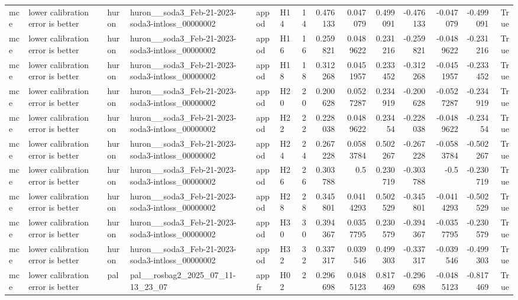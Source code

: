 \begin{longtable}{llllllrrrrrrrr}
mce & lower calibration error is better & huron & huron\_\_soda3\_Feb-21-2023-soda3-intloss\_00000002 & appod & H14 & 14 & 0.476133 & 0.047079 & 0.499091 & -0.476133 & -0.047079 & -0.499091 & True \\
mce & lower calibration error is better & huron & huron\_\_soda3\_Feb-21-2023-soda3-intloss\_00000002 & appod & H16 & 16 & 0.259821 & 0.0489622 & 0.231216 & -0.259821 & -0.0489622 & -0.231216 & True \\
mce & lower calibration error is better & huron & huron\_\_soda3\_Feb-21-2023-soda3-intloss\_00000002 & appod & H18 & 18 & 0.312268 & 0.0451957 & 0.233452 & -0.312268 & -0.0451957 & -0.233452 & True \\
mce & lower calibration error is better & huron & huron\_\_soda3\_Feb-21-2023-soda3-intloss\_00000002 & appod & H20 & 20 & 0.200628 & 0.0527287 & 0.234919 & -0.200628 & -0.0527287 & -0.234919 & True \\
mce & lower calibration error is better & huron & huron\_\_soda3\_Feb-21-2023-soda3-intloss\_00000002 & appod & H22 & 22 & 0.228038 & 0.0489622 & 0.23454 & -0.228038 & -0.0489622 & -0.23454 & True \\
mce & lower calibration error is better & huron & huron\_\_soda3\_Feb-21-2023-soda3-intloss\_00000002 & appod & H24 & 24 & 0.267228 & 0.0583784 & 0.502267 & -0.267228 & -0.0583784 & -0.502267 & True \\
mce & lower calibration error is better & huron & huron\_\_soda3\_Feb-21-2023-soda3-intloss\_00000002 & appod & H26 & 26 & 0.303788 & 0.5 & 0.230719 & -0.303788 & -0.5 & -0.230719 & True \\
mce & lower calibration error is better & huron & huron\_\_soda3\_Feb-21-2023-soda3-intloss\_00000002 & appod & H28 & 28 & 0.345801 & 0.0414293 & 0.502529 & -0.345801 & -0.0414293 & -0.502529 & True \\
mce & lower calibration error is better & huron & huron\_\_soda3\_Feb-21-2023-soda3-intloss\_00000002 & appod & H30 & 30 & 0.394367 & 0.0357795 & 0.230579 & -0.394367 & -0.0357795 & -0.230579 & True \\
mce & lower calibration error is better & huron & huron\_\_soda3\_Feb-21-2023-soda3-intloss\_00000002 & appod & H32 & 32 & 0.337317 & 0.039546 & 0.499303 & -0.337317 & -0.039546 & -0.499303 & True \\
mce & lower calibration error is better & pal & pal\_\_rosbag2\_2025\_07\_11-13\_23\_07 & appfr & H02 & 2 & 0.296698 & 0.0485123 & 0.817469 & -0.296698 & -0.0485123 & -0.817469 & True \\

\end{longtable}
